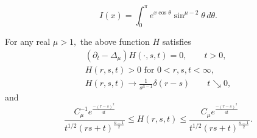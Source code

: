 \documentclass[10pt,a4paper]{amsart}
\newcommand{\p}{\partial}
\begin{document}
\begin{equation}\label{varphidef}
I(x) = \int_0^\pi e^{x \cos \theta } \sin^{\mu - 2} \theta \, d\theta.
\end{equation}

\begin{lemma}\label{lemma:euclheatker} For any real $\mu > 1,$ the above function $H$ satisfies
\begin{equation*}
\begin{split}
\left( \p_t - \Delta_\mu \right) H (\cdot, s,t) = 0, \qquad t > 0, \\
H (r,s,t) > 0 \mbox{ for } 0 < r,s,t < \infty, \\
H (r, s,t) \to \frac{1}{s^{\mu - 1}} \delta(r-s) \qquad t \searrow 0,
\end{split}
\end{equation*}
and
\begin{equation}\label{Hbound}
\frac{C_\mu^{-1} e^{\frac{-(r-s)^2}{4t}}}{t^{1/2} (rs + t)^{\frac{n-1}{2}} } \leq H(r,s,t) \leq \frac{C_\mu e^{\frac{-(r-s)^2}{4t}}}{t^{1/2} (rs + t)^{\frac{n-1}{2}} }.
\end{equation}
\end{lemma}
\end{document}
